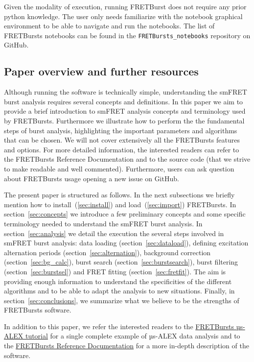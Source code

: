 Given the modality of execution, running FRETBurst does not require
any prior python knowledge. The user only needs familiarize with the
notebook graphical environment to be able to navigate and run the notebooks.
The list of FRETBursts notebooks can be found in the 
\verb|FRETBursts_notebooks| repository on GitHub.

\subsection{Paper overview and further resources}

Although running the software is technically simple, understanding the smFRET 
burst analysis requires several concepts and definitions.
In this paper we aim to provide a brief introduction to smFRET analysis concepts
and terminology used by FRETBursts. Furthermore we illustrate how to perform the
the fundamental steps of burst analysis, highlighting the important parameters
and algorithms that can be chosen. We will not cover extensively all the FRETBursts
features and options. For more detailed information, the interested readers can refer 
to the FRETBursts Reference Documentation and to the source code (that we strive 
to make readable and well commented). 
Furthermore, users can ask question about FRETBursts usage opening a new issue on GitHub.

The present paper is structured as follows. 
In the next subsections we briefly mention how to install~(\ref{sec:install}) and 
load~(\ref{sec:import}) FRETBursts.
In section~\ref{sec:concepts} we
introduce a few preliminary concepts and some specific terminology needed 
to understand the smFRET burst analysis. 
In section~\ref{sec:analysis} we detail the execution the several steps involved
in smFRET burst analysis: data loading (section~\ref{sec:dataload}), defining 
excitation alternation periods (section~\ref{sec:alternation}), background 
correction (section~\ref{sec:bg_calc}), burst search (section~\ref{sec:burstsearch}), 
burst filtering (section~\ref{sec:burstsel}) and FRET fitting (section~\ref{sec:fretfit}).
The aim is providing enough information to understand the specificities of 
the different algorithms and to be able to adapt the analysis to new situations.
Finally, in section~\ref{sec:conclusions}, we summarize what we believe to be
the strengths of FRETBursts software.

In addition to this paper, we refer the interested readers to the 
\href{http://nbviewer.ipython.org/github/tritemio/FRETBursts_notebooks/blob/master/notebooks/FRETBursts\%20-\%20us-ALEX\%20smFRET\%20burst\%20analysis.ipynb}{FRETBursts µs-ALEX tutorial} 
for a single complete example of µs-ALEX data analysis and to the
\href{http://fretbursts.readthedocs.org/}{FRETBursts Reference Documentation}
for a more in-depth description of the software.

